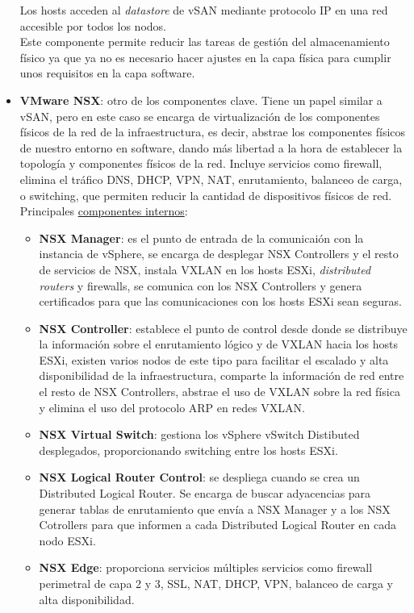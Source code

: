 \begin{itemize}
        \FloatBarrier
    Los hosts acceden al \textit{datastore} de vSAN mediante protocolo IP en una red accesible por todos los nodos. \\ 
    Este componente permite reducir las tareas de gestión del almacenamiento físico ya que ya no es necesario hacer ajustes en la capa física para cumplir unos requisitos en la capa software.
    \item \textbf{VMware NSX}: otro de los componentes clave. Tiene un papel similar a vSAN, pero en este caso se encarga de virtualización de los componentes físicos de la red de la infraestructura, es decir, abstrae los componentes físicos de nuestro entorno en software, dando más libertad a la hora de establecer la topología y componentes físicos de la red. Incluye servicios como firewall, elimina el tráfico  DNS, DHCP, VPN, NAT, enrutamiento, balanceo de carga, o switching, que permiten reducir la cantidad de dispositivos físicos de red.\\
    Principales \underline{componentes internos}\cite{componentesNSX}:
    \begin{itemize}
        \item \textbf{NSX Manager}: es el punto de entrada de la comunicaión con la instancia de vSphere, se encarga de desplegar NSX Controllers y el resto de servicios de NSX, instala VXLAN en los hosts ESXi, \textit{distributed routers} y firewalls, se comunica con los NSX Controllers y genera certificados para que las comunicaciones con los hosts ESXi sean seguras.
        \item \textbf{NSX Controller}: establece el punto de control desde donde se distribuye la información sobre el enrutamiento lógico y de VXLAN hacia los hosts ESXi, existen varios nodos de este tipo para facilitar el escalado y alta disponibilidad de la infraestructura, comparte la información de red entre el resto de NSX Controllers, abstrae el uso de VXLAN sobre la red física y elimina el uso del protocolo ARP en redes VXLAN. 
        \item \textbf{NSX Virtual Switch}: gestiona los vSphere vSwitch Distibuted desplegados, proporcionando switching entre los hosts ESXi.
        \item \textbf{NSX Logical Router Control}: se despliega cuando se crea un Distributed Logical Router. Se encarga de buscar adyacencias para generar tablas de enrutamiento que envía a NSX Manager y a los NSX Cotrollers para que informen a cada Distributed Logical Router en cada nodo ESXi.
        \item \textbf{NSX Edge}: proporciona servicios múltiples servicios como firewall perimetral de capa 2 y 3, SSL, NAT, DHCP, VPN, balanceo de carga y alta disponibilidad.

\end{itemize}
\end{itemize}
